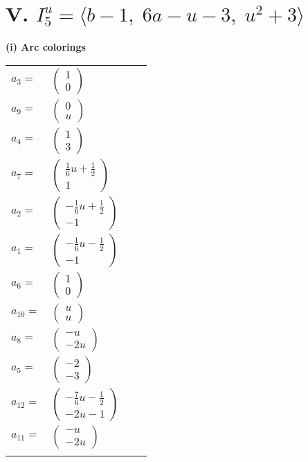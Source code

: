 \documentclass[1p]{elsarticle_modified}
\theoremstyle{definition}
\begin{document}
\centering \section*{V. $I^u_{5}= \langle b-1,\;6 a- u-3,\;u^2+3 \rangle$}
\flushleft \textbf{(i) Arc colorings}\\
\begin{tabular}{m{7pt} m{180pt} m{7pt} m{180pt} }
\flushright $a_{3}=$&$\begin{pmatrix}1\\0\end{pmatrix}$ \\
\flushright $a_{9}=$&$\begin{pmatrix}0\\u\end{pmatrix}$ \\
\flushright $a_{4}=$&$\begin{pmatrix}1\\3\end{pmatrix}$ \\
\flushright $a_{7}=$&$\begin{pmatrix}\frac{1}{6} u+\frac{1}{2}\\1\end{pmatrix}$ \\
\flushright $a_{2}=$&$\begin{pmatrix}-\frac{1}{6} u+\frac{1}{2}\\-1\end{pmatrix}$ \\
\flushright $a_{1}=$&$\begin{pmatrix}-\frac{1}{6} u-\frac{1}{2}\\-1\end{pmatrix}$ \\
\flushright $a_{6}=$&$\begin{pmatrix}1\\0\end{pmatrix}$ \\
\flushright $a_{10}=$&$\begin{pmatrix}u\\u\end{pmatrix}$ \\
\flushright $a_{8}=$&$\begin{pmatrix}- u\\-2 u\end{pmatrix}$ \\
\flushright $a_{5}=$&$\begin{pmatrix}-2\\-3\end{pmatrix}$ \\
\flushright $a_{12}=$&$\begin{pmatrix}-\frac{7}{6} u-\frac{1}{2}\\-2 u-1\end{pmatrix}$ \\
\flushright $a_{11}=$&$\begin{pmatrix}- u\\-2 u\end{pmatrix}$\\&\end{tabular}
\end{document}
